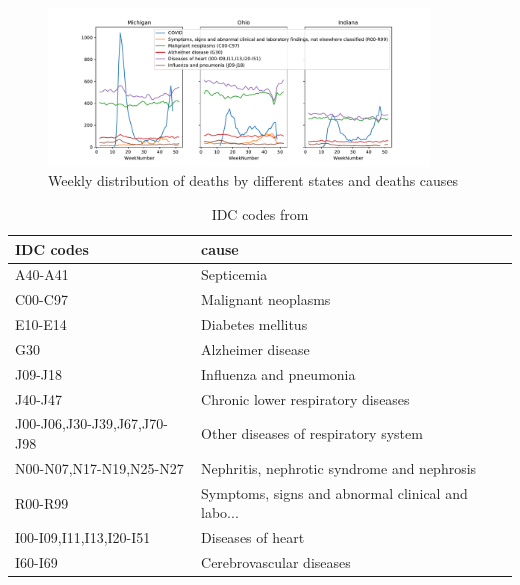 \documentclass[conference]{IEEEtran}
\begin{document}
\begin{figure}
  \centering
  \includegraphics[width=0.9\textwidth]{figs/weekly_deaths}
  \caption{Weekly distribution of deaths by different states and deaths causes}
  \label{fig:weekly_deaths}
\end{figure}

\begin{table}
  \centering
  \begin{tabular}{ll}
\toprule
IDC codes&                                              cause \\
\midrule
A40-A41                     &                                        Septicemia  \\
C00-C97                     &                               Malignant neoplasms  \\
E10-E14                     &                                 Diabetes mellitus  \\
G30                         &                                 Alzheimer disease  \\
J09-J18                     &                           Influenza and pneumonia  \\
J40-J47                     &                Chronic lower respiratory diseases  \\
J00-J06,J30-J39,J67,J70-J98 &              Other diseases of respiratory system  \\
N00-N07,N17-N19,N25-N27     &       Nephritis, nephrotic syndrome and nephrosis  \\
R00-R99                     &  Symptoms, signs and abnormal clinical and labo... \\
I00-I09,I11,I13,I20-I51     &                                 Diseases of heart  \\
I60-I69                     &                          Cerebrovascular diseases  \\
\bottomrule
\end{tabular}
\caption{IDC codes from \cite{cdc_international_nodate}}
\label{tab:IDC_codes}
\end{table}
\end{document}
